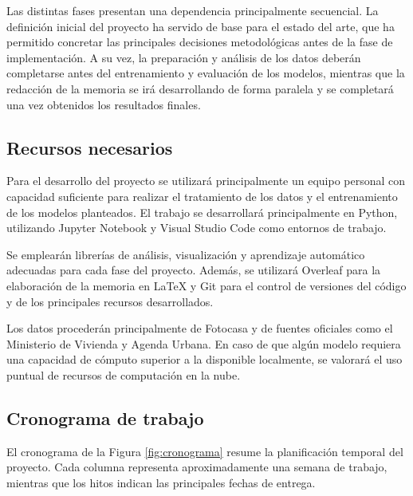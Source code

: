 \documentclass[IB]{TFUOC}%
\begin{document}
Las distintas fases presentan una dependencia principalmente secuencial. La definición inicial del proyecto ha servido de base para el estado del arte, que ha permitido concretar las principales decisiones metodológicas antes de la fase de implementación. A su vez, la preparación y análisis de los datos deberán completarse antes del entrenamiento y evaluación de los modelos, mientras que la redacción de la memoria se irá desarrollando de forma paralela y se completará una vez obtenidos los resultados finales.

\subsection{Recursos necesarios}

Para el desarrollo del proyecto se utilizará principalmente un equipo personal con capacidad suficiente para realizar el tratamiento de los datos y el entrenamiento de los modelos planteados. El trabajo se desarrollará principalmente en Python, utilizando Jupyter Notebook y Visual Studio Code como entornos de trabajo.

Se emplearán librerías de análisis, visualización y aprendizaje automático adecuadas para cada fase del proyecto. Además, se utilizará Overleaf para la elaboración de la memoria en \LaTeX{} y Git para el control de versiones del código y de los principales recursos desarrollados.

Los datos procederán principalmente de Fotocasa y de fuentes oficiales como el Ministerio de Vivienda y Agenda Urbana. En caso de que algún modelo requiera una capacidad de cómputo superior a la disponible localmente, se valorará el uso puntual de recursos de computación en la nube.

\subsection{Cronograma de trabajo}

El cronograma de la Figura \ref{fig:cronograma} resume la planificación temporal del proyecto. Cada columna representa aproximadamente una semana de trabajo, mientras que los hitos indican las principales fechas de entrega.
\end{document}

